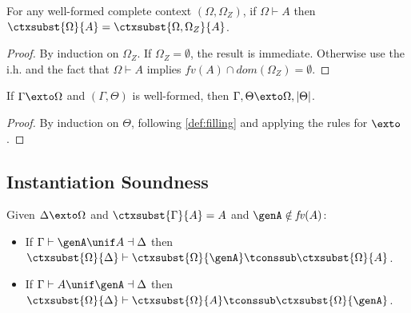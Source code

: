 \begin{mlemma}
  For any well-formed complete context $(\Omega, \Omega_Z)$, if $\Omega \vdash A$
  then $\ctxsubst{\Omega}{A} = \ctxsubst{\Omega,\Omega_Z}{A}$.
  \label{lemma:subst_stable}
\end{mlemma}
\begin{proof}
  By induction on $\Omega_Z$. If $\Omega_Z = \emptyset$, the result is
  immediate. Otherwise use the i.h. and the fact that $\Omega \vdash A$ implies
  $\mathit{fv}(A) \cap \mathit{dom}(\Omega_Z) = \emptyset$.
\end{proof}


\begin{mlemma}
  If $\Gamma \exto \Omega$ and $(\Gamma, \Theta)$ is well-formed, then $\Gamma,
  \Theta \exto \Omega, |\Theta|$.
  \label{lemma:filling_completes}
\end{mlemma}
\begin{proof}
  By induction on $\Theta$, following \cref{def:filling} and applying
  the rules for $\exto$.
\end{proof}



\subsection{Instantiation Soundness}

\begin{mtheorem} \label{thm:inst_soundness}%
  Given $\Delta \exto \Omega$ and $\ctxsubst{\Gamma}{A} = A$ and $\genA \notin \mathit{fv}(A)$:
  \begin{itemize}
  \item If $\Gamma \vdash \genA \unif A \dashv \Delta$ then $\ctxsubst{\Omega}{\Delta} \vdash \ctxsubst{\Omega}{\genA} \tconssub \ctxsubst{\Omega}{A}$.
  \item If $\Gamma \vdash A \unif \genA \dashv \Delta$ then $\ctxsubst{\Omega}{\Delta} \vdash \ctxsubst{\Omega}{A} \tconssub \ctxsubst{\Omega}{\genA}$.
  \end{itemize}
\end{mtheorem}

